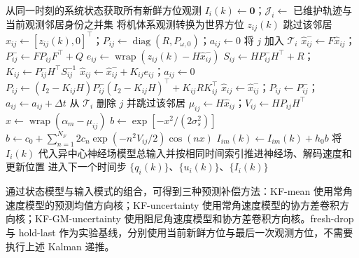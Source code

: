 \documentclass[UTF8,fontset=windows,11pt]{ctexart}
\begin{document}
\begin{algorithm}[htbp]
 \ContinuedFloat
 \caption{（续）：输入构造及闭环推进}
 \scriptsize
 \begin{algorithmic}
  \State 从同一时刻的系统状态获取所有新鲜方位观测
   \State $I_i(k)\leftarrow\mathbf 0$；$\mathcal J_i\leftarrow$ 已维护轨迹与当前观测邻居身份之并集
     \State 将机体系观测转换为世界方位 $z_{ij}(k)$
    \EndIf
      \State 跳过该邻居
     \Else
      \State $\hat x_{ij}\leftarrow[z_{ij}(k),0]^\top$；$P_{ij}\leftarrow\operatorname{diag}(R,P_{\omega,0})$；$a_{ij}\leftarrow0$
      \State 将 $j$ 加入 $\mathcal T_i$
     \EndIf
    \Else
     \State $\hat x^-_{ij}\leftarrow F\hat x_{ij}$；$P^-_{ij}\leftarrow FP_{ij}F^\top+Q$
      \State $e_{ij}\leftarrow\operatorname{wrap}(z_{ij}(k)-H\hat x^-_{ij})$
      \State $S_{ij}\leftarrow HP^-_{ij}H^\top+R$；$K_{ij}\leftarrow P^-_{ij}H^\top S_{ij}^{-1}$
      \State $\hat x_{ij}\leftarrow\hat x^-_{ij}+K_{ij}e_{ij}$；$a_{ij}\leftarrow0$
      \State $P_{ij}\leftarrow(I_2-K_{ij}H)P^-_{ij}(I_2-K_{ij}H)^\top+K_{ij}RK_{ij}^\top$
     \Else
      \State $\hat x_{ij}\leftarrow\hat x^-_{ij}$；$P_{ij}\leftarrow P^-_{ij}$；$a_{ij}\leftarrow a_{ij}+\Delta t$
     \EndIf
      \State 从 $\mathcal T_i$ 删除 $j$ 并跳过该邻居
     \EndIf
     \State $\mu_{ij}\leftarrow H\hat x_{ij}$；$V_{ij}\leftarrow HP_{ij}H^\top$
      \State $x\leftarrow\operatorname{wrap}(\alpha_m-\mu_{ij})$
       \State $b\leftarrow\exp[-x^2/(2\sigma_s^2)]$
      \Else
       \State $b\leftarrow c_0+\sum_{n=1}^{N_F}2c_n\exp(-n^2V_{ij}/2)\cos(nx)$
      \EndIf
      \State $I_{im}(k)\leftarrow I_{im}(k)+h_0b$
     \EndFor
    \EndIf
   \EndFor
   \State 将 $I_i(k)$ 代入异中心神经场模型总输入并按相同时间索引推进神经场、解码速度和更新位置
  \EndFor
  \State 进入下一个时间步
 \EndFor
 \State \Return $\{q_i(k)\}$、$\{u_i(k)\}$、$\{I_i(k)\}$
 \end{algorithmic}
\end{algorithm}
\clearpage

通过状态模型与输入模式的组合，可得到三种预测补偿方法：KF-mean 使用常角速度模型的预测均值方向核；KF-uncertainty 使用常角速度模型的协方差卷积方向核；KF-GM-uncertainty 使用阻尼角速度模型和协方差卷积方向核。fresh-drop 与 hold-last 作为实验基线，分别使用当前新鲜方位与最后一次观测方位，不需要执行上述 Kalman 递推。
\end{document}
